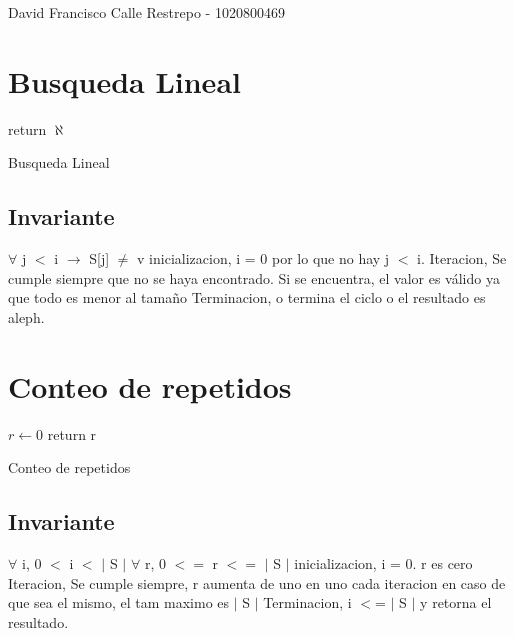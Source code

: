 \documentclass{article}
\begin{document}
David Francisco Calle Restrepo - 1020800469

\section{Busqueda Lineal}



\begin{algorithm}[htp]
\DontPrintSemicolon
\SetAlgoLined
{}
\BlankLine

	return $\aleph$\;

\caption{Busqueda Lineal}
\end{algorithm}
\bigskip %
\subsection{Invariante}
$\forall$ j $<$ i $\rightarrow$  S[j] $\neq$ v
inicializacion, i = 0 por lo que no hay j $<$ i.	\BlankLine
Iteracion, Se cumple siempre que no se haya encontrado. Si se encuentra, el valor es válido ya que todo es menor al tamaño	\BlankLine
Terminacion, o termina el ciclo o el resultado es aleph.	\BlankLine

\section{Conteo de repetidos}


\begin{algorithm}[H]
\DontPrintSemicolon
\SetAlgoLined
{}
\BlankLine

$r\leftarrow 0$
\BlankLine
{}
return r
\caption{Conteo de repetidos}
\end{algorithm}
\subsection{Invariante}
$\forall$ i, 0 $<$ i $<$ $|$ S $|$	\BlankLine
$\forall$ r, 0 $<=$ r $<=$ $|$ S $|$	\BlankLine
inicializacion, i = 0. r es cero	\BlankLine
Iteracion, Se cumple siempre, r aumenta de uno en uno cada iteracion en caso de que sea el mismo, el tam maximo es $|$ S $|$	\BlankLine
Terminacion, i $<$= $|$ S $|$ y retorna el resultado.	\BlankLine
\end{document}
